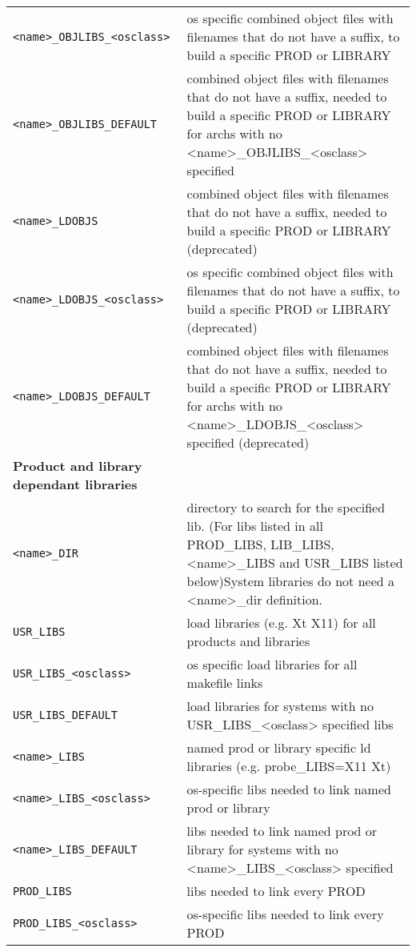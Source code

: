 \begin{center}
\begin{longtable}{p{2.94784in}p{3.76247in}}
\verb|<name>_OBJLIBS_<osclass>| & os specific combined object files with filenames that do not have a suffix, to build a specific PROD or LI\textbar{}BRARY\\
\verb|<name>_OBJLIBS_DEFAULT| & combined object files with filenames that do not have a suffix, needed to build a specific PROD or LIBRARY for archs with no \textless{}name\textgreater{}\_OBJLIBS\_\textless{}osclass\textgreater{} specified\\
\verb|<name>_LDOBJS| & combined object files with filenames that do not have a suffix, needed to build a specific PROD or LIBRARY (deprecated)\\
\verb|<name>_LDOBJS_<osclass>| & os specific combined object files with filenames that do not have a suffix, to build a specific PROD or LI\textbar{}BRARY (deprecated)\\
\verb|<name>_LDOBJS_DEFAULT| & combined object files with filenames that do not have a suffix, needed to build a specific PROD or LIBRARY for archs with no \textless{}name\textgreater{}\_LDOBJS\_\textless{}osclass\textgreater{} specified (deprecated)\\
\textbf{Product and library dependant libraries} & \\
\hline
\verb|<name>_DIR| & directory to search for the specified lib. (For libs listed in all PROD\_LIBS, LIB\_LIBS, \textless{}name\textgreater{}\_LIBS and USR\_LIBS listed below)System libraries do not need a \textless{}name\textgreater{}\_dir definition.\\
\verb|USR_LIBS| & load libraries (e.g. Xt X11) for all products and libraries\\
\verb|USR_LIBS_<osclass>| & os specific load libraries for all makefile links\\
\verb|USR_LIBS_DEFAULT| & load libraries for systems with no USR\_LIBS\_\textless{}osclass\textgreater{} specified libs\\
\verb|<name>_LIBS| & named prod or library specific ld libraries (e.g. probe\_LIBS=X11 Xt)\\
\verb|<name>_LIBS_<osclass>| & os-specific libs needed to link named prod or library\\
\verb|<name>_LIBS_DEFAULT| & libs needed to link named prod or library for systems with no \textless{}name\textgreater{}\_LIBS\_\textless{}osclass\textgreater{} specified\\
\verb|PROD_LIBS| & libs needed to link every PROD\\
\verb|PROD_LIBS_<osclass>| & os-specific libs needed to link every PROD\\

\end{longtable}
\end{center}
